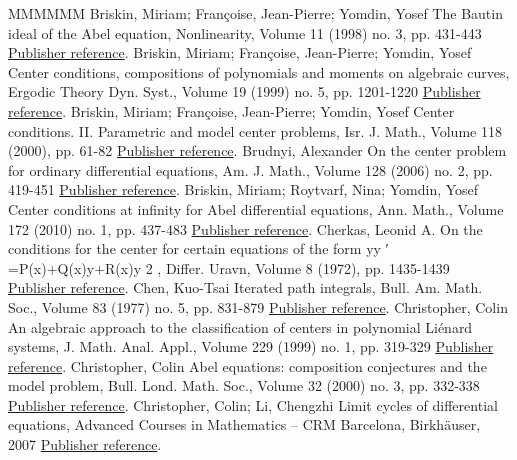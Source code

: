 \begin{thebibliography}{MMMMMM}
 Briskin, Miriam; Françoise, Jean-Pierre; Yomdin, Yosef The Bautin ideal of the Abel equation, Nonlinearity, Volume 11 (1998) no. 3, pp. 431-443 \href{https://ahl.centre-mersenne.org/item/AHL_2020__3__615_0/#bfy98}{Publisher reference}.
 Briskin, Miriam; Françoise, Jean-Pierre; Yomdin, Yosef Center conditions, compositions of polynomials and moments on algebraic curves, Ergodic Theory Dyn. Syst., Volume 19 (1999) no. 5, pp. 1201-1220 \href{https://ahl.centre-mersenne.org/item/AHL_2020__3__615_0/#bfy99}{Publisher reference}.
 Briskin, Miriam; Françoise, Jean-Pierre; Yomdin, Yosef Center conditions. II. Parametric and model center problems, Isr. J. Math., Volume 118 (2000), pp. 61-82 \href{https://ahl.centre-mersenne.org/item/AHL_2020__3__615_0/#bfy00}{Publisher reference}.
 Brudnyi, Alexander On the center problem for ordinary differential equations, Am. J. Math., Volume 128 (2006) no. 2, pp. 419-451 \href{https://ahl.centre-mersenne.org/item/AHL_2020__3__615_0/#brud06}{Publisher reference}.
 Briskin, Miriam; Roytvarf, Nina; Yomdin, Yosef Center conditions at infinity for Abel differential equations, Ann. Math., Volume 172 (2010) no. 1, pp. 437-483 \href{https://ahl.centre-mersenne.org/item/AHL_2020__3__615_0/#bry10}{Publisher reference}.
 Cherkas, Leonid A. On the conditions for the center for certain equations of the form yy ′ =P(x)+Q(x)y+R(x)y 2 , Differ. Uravn, Volume 8 (1972), pp. 1435-1439 \href{https://ahl.centre-mersenne.org/item/AHL_2020__3__615_0/#cher72}{Publisher reference}.
 Chen, Kuo-Tsai Iterated path integrals, Bull. Am. Math. Soc., Volume 83 (1977) no. 5, pp. 831-879 \href{https://ahl.centre-mersenne.org/item/AHL_2020__3__615_0/#chen77}{Publisher reference}.
 Christopher, Colin An algebraic approach to the classification of centers in polynomial Liénard systems, J. Math. Anal. Appl., Volume 229 (1999) no. 1, pp. 319-329 \href{https://ahl.centre-mersenne.org/item/AHL_2020__3__615_0/#chri99}{Publisher reference}.
 Christopher, Colin Abel equations: composition conjectures and the model problem, Bull. Lond. Math. Soc., Volume 32 (2000) no. 3, pp. 332-338 \href{https://ahl.centre-mersenne.org/item/AHL_2020__3__615_0/#chri00}{Publisher reference}.
 Christopher, Colin; Li, Chengzhi Limit cycles of differential equations, Advanced Courses in Mathematics – CRM Barcelona, Birkhäuser, 2007 \href{https://ahl.centre-mersenne.org/item/AHL_2020__3__615_0/#chri07}{Publisher reference}.

\end{thebibliography}
